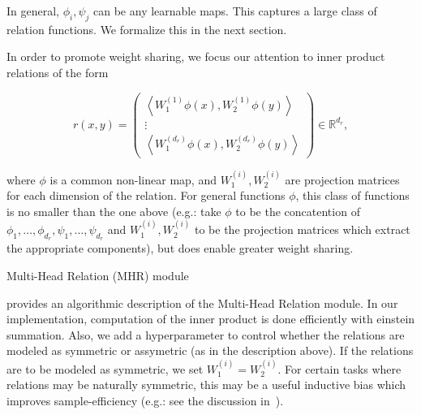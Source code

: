 In general, $\phi_i, \psi_j$ can be any learnable maps. This captures a large class of relation functions. We formalize this in the next section.

In order to promote weight sharing, we focus our attention to inner product relations of the form

\begin{equation*}
    r(x,y) = \begin{pmatrix} \left\langle W_1^{(1)}\phi(x), W_2^{(1)} \phi(y) \right\rangle \\  \vdots \\ \left\langle W_1^{(d_r)}\phi(x), W_2^{(d_r)} \phi(y) \right\rangle \end{pmatrix} \in \mathbb{R}^{d_r},
\end{equation*}

where $\phi$ is a common non-linear map, and $W_1^{(i)}, W_2^{(i)}$ are projection matrices for each dimension of the relation. For general functions $\phi$, this class of functions is no smaller than the one above (e.g.: take $\phi$ to be the concatention of $\phi_1, \ldots, \phi_{d_r}, \psi_1, \ldots, \psi_{d_r}$ and $W_1^{(i)}, W_2^{(i)}$ to be the projection matrices which extract the appropriate components), but does enable greater weight sharing.

\begin{algorithm}[ht!]
	\caption{Multi-Head Relation (MHR) module}\label{alg:multiheadrelation}

	\vspace{1em}

\end{algorithm}

 provides an algorithmic description of the Multi-Head Relation module. In our implementation, computation of the inner product is done efficiently with einstein summation. Also, we add a hyperparameter to control whether the relations are modeled as symmetric or assymetric (as in the description above). If the relations are to be modeled as symmetric, we set $W_1^{(i)} = W_2^{(i)}$. For certain tasks where relations may be naturally symmetric, this may be a useful inductive bias which improves sample-efficiency (e.g.: see the discussion in~\cite{kerg2022neural}).

